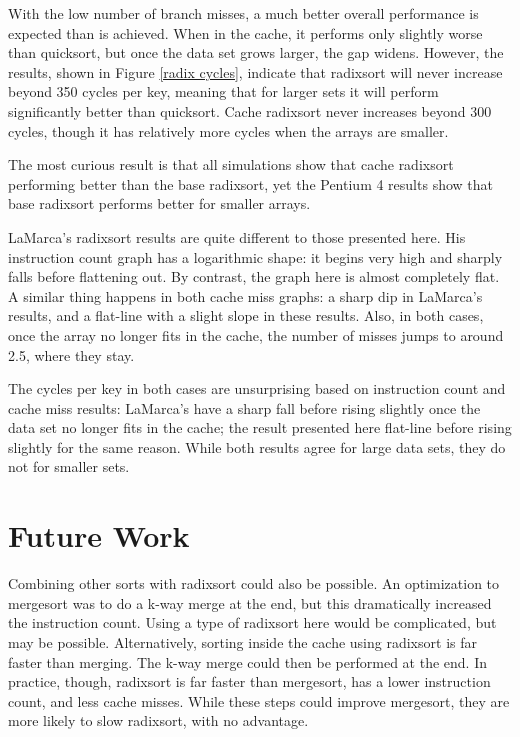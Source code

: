 With the low number of branch misses, a much better overall performance is
expected than is achieved. When in the cache, it performs only slightly worse
than quicksort, but once the data set grows larger, the gap widens.  However,
the results, shown in Figure \ref{radix cycles}, indicate that radixsort will
never increase beyond 350 cycles per key, meaning that for larger sets it will
perform significantly better than quicksort. Cache radixsort never increases
beyond 300 cycles, though it has relatively more cycles when the arrays are
smaller. 

The most curious result is that all simulations show that cache radixsort
performing better than the base radixsort, yet the Pentium 4 results show that
base radixsort performs better for smaller arrays.

LaMarca's radixsort results are quite different to those presented here. His
instruction count graph has a logarithmic shape: it begins very high and sharply
falls before flattening out. By contrast, the graph here is almost completely
flat. A similar thing happens in both cache miss graphs: a sharp dip in
LaMarca's results, and a flat-line with a slight slope in these results. Also,
in both cases, once the array no longer fits in the cache, the number of misses
jumps to around 2.5, where they stay. 

The cycles per key in both cases are unsurprising based on instruction count and
cache miss results: LaMarca's have a sharp fall before rising slightly once the
data set no longer fits in the cache; the result presented here flat-line before rising
slightly for the same reason. While both results agree for large data sets, they do not
for smaller sets.

\section{Future Work}
\label{radix future work}
Combining other sorts with radixsort could also be possible. An optimization to
mergesort was to do a k-way merge at the end, but this dramatically increased
the instruction count. Using a type of radixsort here would be complicated, but
may be possible. Alternatively, sorting inside the cache using radixsort is far
faster than merging. The k-way merge could then be performed at the end. In
practice, though, radixsort is far faster than mergesort, has a lower
instruction count, and less cache misses. While these steps could improve
mergesort, they are more likely to slow radixsort, with no advantage.

